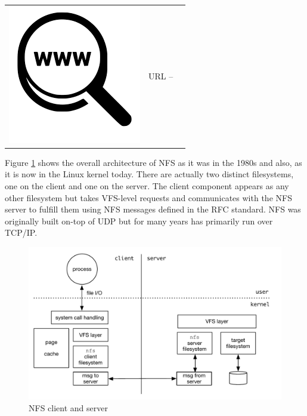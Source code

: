 \begin{table}[h]
\begin{tabular}{lcl}
\parbox[r]{0.5in}{\includegraphics[scale=0.15]{figures/url.png}} & \parbox[l]{0.55in}{URL  -- } & \parbox[l]{3in}{}
\end{tabular}
\end{table}

\noindent
Figure \ref{fig:nfs} shows the overall architecture of NFS as it was in the 1980s and also, as it is now in the Linux kernel today. There are actually two distinct filesystems, one on the client and one on the server. The client component appears as any other filesystem but takes VFS-level requests and communicates with the NFS server to fulfill them using NFS messages defined in the RFC standard. NFS was originally built on-top of UDP but for many years has primarily run over TCP/IP.

\begin{figure}[h]
	\includegraphics[scale=0.6]{figures/nfs.pdf}
	\centering
	\caption{NFS client and server}
	\label{fig:nfs}
\end{figure}

